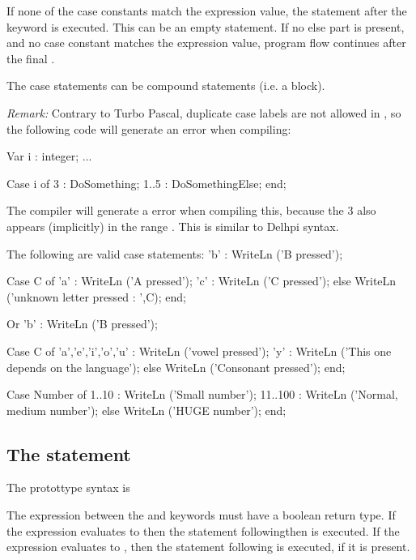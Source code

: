 \documentclass{report}
\begin{document}
If none of the case constants match the expression value, the statement
after the  keyword is executed. This can be an empty statement.
If no else part is present, and no case constant matches the expression
value, program flow continues after the final .

The case statements can be compound statements 
(i.e. a  block).

{\em Remark:} Contrary to Turbo Pascal, duplicate case labels are not
allowed in \fpc, so the following code will generate an error when
compiling:

\begin{listing}
Var i : integer;
...

Case i of
 3 : DoSomething;
 1..5 : DoSomethingElse;
end;
\end{listing}
The compiler will generate a  error when compiling
this, because the 3 also appears (implicitly) in the range . This
is similar to Delhpi syntax.

The following are valid case statements:
 'b' : WriteLn ('B pressed');
\begin{listing}
Case C of 
 'a' : WriteLn ('A pressed');
 'c' : WriteLn ('C pressed');
else
  WriteLn ('unknown letter pressed : ',C);
end;
\end{listing}
Or 
 'b' : WriteLn ('B pressed');
\begin{listing}
Case C of 
 'a','e','i','o','u' : WriteLn ('vowel pressed');
 'y' : WriteLn ('This one depends on the language');
else
  WriteLn ('Consonant pressed');
end;
\end{listing}
\begin{listing}
Case Number of 
 1..10   : WriteLn ('Small number');
 11..100 : WriteLn ('Normal, medium number');
else
 WriteLn ('HUGE number');
end;
\end{listing}

\subsection{The  statement}
The  protottype syntax is



The expression between the  and  keywords must have a
boolean return type. If the expression evaluates to  then the 
statement following{then} is executed. If the expression evaluates to 
, then the statement following  is executed, if it is
present.
\end{document}
